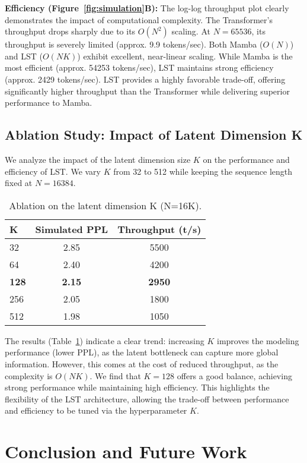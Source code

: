 \documentclass[10pt,twocolumn,letterpaper]{article}
\begin{document}
\textbf{Efficiency (Figure~\ref{fig:simulation}B):} The log-log throughput plot clearly demonstrates the impact of computational complexity. The Transformer's throughput drops sharply due to its \(O(N^{2})\) scaling. At \(N=65536\), its throughput is severely limited (approx. 9.9 tokens/sec). Both Mamba (\(O(N)\)) and LST (\(O(NK)\)) exhibit excellent, near-linear scaling. While Mamba is the most efficient (approx. 54253 tokens/sec), LST maintains strong efficiency (approx. 2429 tokens/sec). LST provides a highly favorable trade-off, offering significantly higher throughput than the Transformer while delivering superior performance to Mamba.

\subsection{Ablation Study: Impact of Latent Dimension K}

We analyze the impact of the latent dimension size \(K\) on the performance and efficiency of LST. We vary \(K\) from 32 to 512 while keeping the sequence length fixed at \(N=16384\).

\begin{table}[h]
\centering
\small
\begin{tabular}{@{}lcc@{}}
\toprule
\textbf{K} & \textbf{Simulated PPL} & \textbf{Throughput (t/s)} \\
\midrule
32 & 2.85 & 5500 \\
64 & 2.40 & 4200 \\
\textbf{128} & \textbf{2.15} & \textbf{2950} \\
256 & 2.05 & 1800 \\
512 & 1.98 & 1050 \\
\bottomrule
\end{tabular}
\caption{Ablation on the latent dimension K (N=16K).}
\label{tab:ablation_k}
\end{table}

The results (Table~\ref{tab:ablation_k}) indicate a clear trend: increasing \(K\) improves the modeling performance (lower PPL), as the latent bottleneck can capture more global information. However, this comes at the cost of reduced throughput, as the complexity is \(O(NK)\). We find that \(K=128\) offers a good balance, achieving strong performance while maintaining high efficiency. This highlights the flexibility of the LST architecture, allowing the trade-off between performance and efficiency to be tuned via the hyperparameter \(K\).

\section{Conclusion and Future Work}
\end{document}
